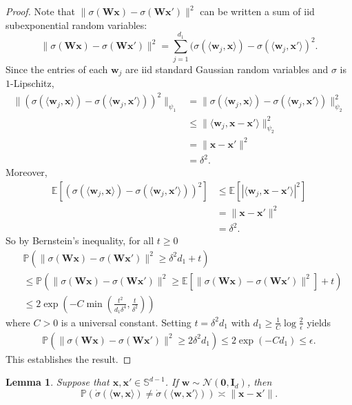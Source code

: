 \documentclass{article}
\newtheorem{lemma}[theorem]{Lemma}
\theoremstyle{definition}
\renewcommand{\P}{\mathbb{P}}
\newcommand{\E}{\mathbb{E}}
\newcommand{\mc}{\mathcal}
\renewcommand{\S}{\mathbb{S}}
\def\vw{{\bm{w}}}
\def\vx{{\bm{x}}}
\def\mI{{\bm{I}}}
\def\mW{{\bm{W}}}
\begin{document}
\begin{proof}
    Note that $\|\sigma(\mW \vx) - \sigma(\mW \vx')\|^2$ can be written a sum of iid subexponential random variables:
    \[\|\sigma(\mW \vx) - \sigma(\mW \vx')\|^2 = \sum_{j = 1}^{d_{1}} (\sigma(\langle \vw_j, \vx \rangle) - \sigma(\langle \vw_j, \vx' \rangle )^2. \]
    Since the entries of each $\vw_j$ are iid standard Gaussian random variables and $\sigma$ is $1$-Lipschitz,
    \begin{align*}
        \|(\sigma(\langle \vw_j, \vx \rangle) - \sigma(\langle \vw_j, \vx' \rangle) )^2\|_{\psi_1} &= \|\sigma(\langle \vw_j, \vx \rangle) - \sigma(\langle \vw_j, \vx' \rangle)\|_{\psi_2}^2\\
        &\leq \|\langle \vw_j, \vx - \vx' \rangle\|_{\psi_2}^2\\
        &= \|\vx - \vx'\|^2\\
        &= \delta^2.
    \end{align*}
    Moreover,
    \begin{align*}
        \E[(\sigma(\langle \vw_j, \vx \rangle) - \sigma(\langle \vw_j, \vx' \rangle) )^2 ] &\leq  \E[|\langle \vw_j, \vx - \vx' \rangle|^2 ]\\
        &= \|\vx - \vx'\|^2\\
        &= \delta^2.
    \end{align*}
    So by Bernstein's inequality, for all $t \geq 0$
    \begin{align*}
        &\P\left(\|\sigma(\mW \vx) - \sigma(\mW \vx')\|^2 \geq \delta^2d_1 + t  \right) \\&\leq \P\left(\|\sigma(\mW \vx) - \sigma(\mW \vx')\|^2 \geq \E[\|\sigma(\mW \vx) - \sigma(\mW \vx')\|^2 ] + t  \right)\\
        &\leq 2 \exp\left(-C\min\left(\frac{t^2}{d_1 \delta^4}, \frac{t}{\delta^2} \right) \right)
    \end{align*}
    where $C > 0$ is a universal constant. Setting $t =  \delta^2 d_1$ with $d_1 \geq \frac{1}{C} \log \frac{2}{\epsilon}$ yields
    \begin{align*}
        \P(\|\sigma(\mW \vx) - \sigma(\mW \vx')\|^2 \geq 2\delta^2 d_1) \leq 2 \exp\left(-C d_1 \right) \leq \epsilon.
    \end{align*}
     This establishes the result.
\end{proof}
\begin{lemma}\label{lemma:cosine-probabilities}
    Suppose that $\vx, \vx' \in \S^{d-1}$. If $\vw \sim \mc{N}(\bm{0}, \mI_d)$, then
    \[\P(\dot{\sigma}(\langle \vw, \vx \rangle) \neq \dot{\sigma}(\langle \vw, \vx' \rangle)) \asymp  \|\vx - \vx'\|.  \]
\end{lemma}
\end{document}
